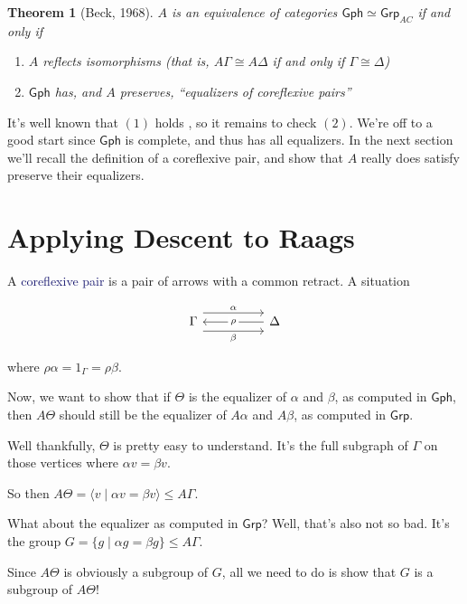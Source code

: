 \documentclass[12pt]{article}
\newtheorem{thm}{Theorem}
\theoremstyle{definition}
\theoremstyle{theorem}
\newcommand*{\catFont}[1]{\mathsf{#1}}
\newcommand{\Grp}{\catFont{Grp}}
\newcommand*{\important}[1]{\textcolor{MidnightBlue}{#1}}
\begin{document}
\begin{thm}[Beck, 1968]
    $A$ is an equivalence of categories $\mathsf{Gph} \simeq \Grp_{AC}$ 
    if and only if

    \begin{enumerate}
        \item $A$ reflects isomorphisms (that is, $A\Gamma \cong A\Delta$ if and only if $\Gamma \cong \Delta$)
        \item $\mathsf{Gph}$ has, and $A$ preserves, ``equalizers of coreflexive pairs''
    \end{enumerate}
\end{thm}

It's well known that $(1)$ holds \cite{dromsIsomorphismsGraphGroups1987}, 
so it remains to check $(2)$. We're off to a good start since $\mathsf{Gph}$
is complete, and thus has all equalizers. In the next section we'll recall
the definition of a coreflexive pair, and show that $A$ really does satisfy
preserve their equalizers.

\section{Applying Descent to Raags}
\label{proof}

A \important{coreflexive pair} is a pair of arrows with a common retract. 
A situation

\[\begin{tikzcd}
	\Gamma && \Delta
	\arrow["\alpha", shift left=3, from=1-1, to=1-3]
	\arrow["\beta"', shift right=3, from=1-1, to=1-3]
	\arrow["\rho"{description}, from=1-3, to=1-1]
\end{tikzcd}\]

where $\rho \alpha = 1_\Gamma = \rho \beta$.

Now, we want to show that if $\Theta$ is the equalizer of $\alpha$ and $\beta$,
as computed in $\mathsf{Gph}$, 
then $A\Theta$ should still be the equalizer of $A \alpha$ and $A \beta$, 
as computed in $\mathsf{Grp}$.

Well thankfully, $\Theta$ is pretty easy to understand. It's the full subgraph
of $\Gamma$ on those vertices where $\alpha v = \beta v$.

So then $A\Theta = \langle v \mid \alpha v = \beta v \rangle \leq A \Gamma$.

What about the equalizer as computed in $\mathsf{Grp}$? Well, that's also not
so bad. It's the group $G = \{ g \mid \alpha g = \beta g \} \leq A\Gamma$.

Since $A\Theta$ is obviously a subgroup of $G$, all we need to do is show that 
$G$ is a subgroup of $A\Theta$! 
\end{document}
